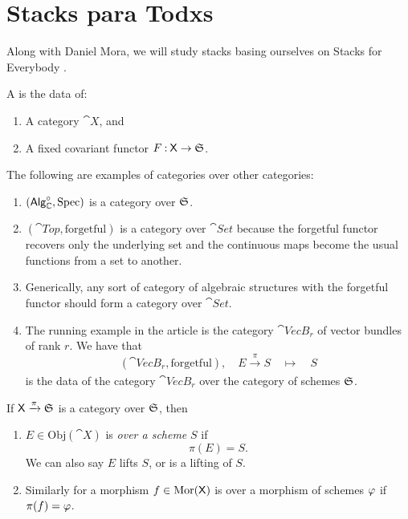 \documentclass[12pt]{memoir}
\begin{document}
\section{Stacks para Todxs}

Along with Daniel Mora, we will study stacks basing ourselves on Stacks for Everybody . 

\begin{Def}
    A  is the data of:
    \begin{enumerate}
        \item A category \(\cat{X}\), and
        \item A fixed covariant functor \(F\mathbin{:}\mathsf{X}\to\mathfrak{S}\).
    \end{enumerate}
\end{Def}

\begin{Ex}
    The following are examples of categories over other categories:
    \begin{enumerate}
        \item \(\left(\mathsf{Alg}_{\mathbb{C}}^{\circ},\operatorname{Spec}\right)\) is a category over \(\mathfrak{S}\).
        \item \(\left(\cat{Top},\text{forgetful}\right)\) is a category over \(\cat{Set}\) because the forgetful functor recovers only the underlying set and the continuous maps become the usual functions from a set to another. 
        \item Generically, any sort of category of algebraic structures with the forgetful functor should form a category over \(\cat{Set}\).
        \item The running example in the article is the category \(\cat{VecB}_r\) of vector bundles of rank \(r\). We have that 
        \[
        \left(\cat{VecB}_r,\text{forgetful}\right),\quad E\xrightarrow[]{\pi}S\quad\mapsto\quad S
        \]
        is the data of the category \(\cat{VecB}_r\) over the category of schemes \(\mathfrak{S}\).
    \end{enumerate}
\end{Ex}

\begin{Def}
    If \(\mathsf{X}\xrightarrow[]{\pi}\mathfrak{S}\) is a category over \(\mathfrak{S}\), then 
    \begin{enumerate}
        \item \(E\in\text{Obj}(\cat{X})\) is \emph{over a scheme} \(S\) if 
        \[
        \pi(E)=S.
        \]
        We can also say \(E\) lifts \(S\), or is a lifting of \(S\).
        \item Similarly for a morphism \(f\in\operatorname{Mor}(\mathsf{X})\) is over a morphism of schemes \(\varphi\) if \(\pi(f)=\varphi\).
    \end{enumerate} 
\end{Def}
\ifx\nextra\undefined
    \printindex
\else\fi
\nocite{*}


\end{document}
